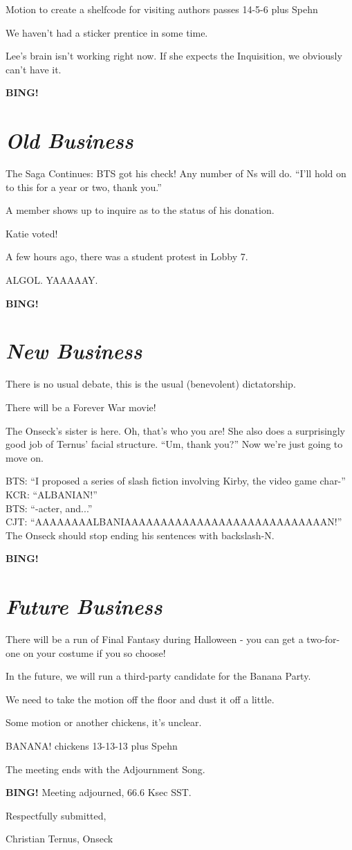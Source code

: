 \documentclass[10pt]{article}
\newcommand{\bing}{{\bf BING!} }
\newcommand{\goto}[1]{\bing \vskip 12pt \section*{{\em{#1}}}}
\newcommand{\ps}{ plus Spehn\xspace}
\begin{document}
Motion to create a shelfcode for visiting authors passes 14-5-6 \ps

We haven't had a sticker prentice in some time.

Lee's brain isn't working right now.  If she expects the Inquisition,
we obviously can't have it.

\goto{Old Business}

The Saga Continues: BTS got his check!  Any number of Ns will do.
``I'll hold on to this for a year or two, thank you.''

A member shows up to inquire as to the status of his donation.

Katie voted!

A few hours ago, there was a student protest in Lobby 7.

ALGOL.  YAAAAAY.

\goto{New Business}

There is no usual debate, this is the usual (benevolent) dictatorship.

There will be a Forever War movie!

The Onseck's sister is here.  Oh, that's who you are!  She also does a
surprisingly good job of Ternus' facial structure.  ``Um, thank you?''
Now we're just going to move on.

BTS: ``I proposed a series of slash fiction involving Kirby, the video game char-''\\
KCR: ``ALBANIAN!''\\
BTS: ``-acter, and...''\\
CJT: ``AAAAAAAALBANIAAAAAAAAAAAAAAAAAAAAAAAAAAAAN!''\\

The Onseck should stop ending his sentences with backslash-N. 

\goto{Future Business}

There will be a run of Final Fantasy during Halloween - you can get a
two-for-one on your costume if you so choose!

In the future, we will run a third-party candidate for the Banana Party.  

We need to take the motion off the floor and dust it off a little.

Some motion or another chickens, it's unclear.

BANANA! chickens 13-13-13\ps

The meeting ends with the Adjournment Song.

\bing
\noindent
Meeting adjourned, 66.6 Ksec SST.

\vspace{18pt}

\centerline{Respectfully submitted,}
\centerline{Christian Ternus, Onseck}
\end{document}
